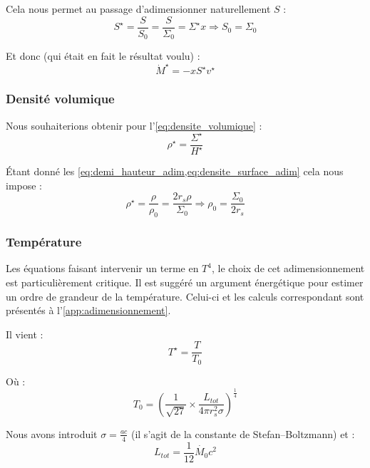 Cela nous permet au passage d’adimensionner naturellement $S$ :
\begin{equation}
    S^\star = \frac{S}{S_0} = \frac{S}{\Sigma_0} = \Sigma^\star x \Rightarrow S_0 = \Sigma_0
\end{equation}

Et donc (qui était en fait le résultat voulu) :
\begin{equation}
    \dot{M}^\star = - x S^\star v^\star
\end{equation}

\subsubsection{Densité volumique}

Nous souhaiterions obtenir pour l’\cref{eq:densite_volumique} :
\begin{equation}
    \rho^\star = \frac{\Sigma^\star}{H^\star}
\end{equation}

Étant donné les \cref{eq:demi_hauteur_adim,eq:densite_surface_adim} cela nous
impose :
\begin{equation}
    \rho^\star = \frac{\rho}{\rho_0} = \frac{2 r_s \rho}{\Sigma_0} \Rightarrow \rho_0 = \frac{\Sigma_0}{2 r_s}
\end{equation}

\subsubsection{Température}

Les équations faisant intervenir un terme en $T^4$, le choix de cet
adimensionnement est particulièrement critique. Il est suggéré un argument
énergétique pour estimer un ordre de grandeur de la température. Celui-ci et
les calculs correspondant sont présentés à l’\cref{app:adimensionnement}. 

Il vient :
\begin{equation}
    T^{\star} = \frac{T}{T_0}
\end{equation}

Où :
\begin{equation}
    T_0 = \left(\frac{1}{\sqrt{27}} \times \frac{L_{tot}}{4 \pi r_s^2 \sigma} \right)^\frac{1}{4}
\end{equation}

Nous avons introduit $\sigma = \frac{a c}{4}$ (il s’agit de la constante de
Stefan–Boltzmann) et :
\begin{equation}
    L_{tot} = \frac{1}{12} \dot{M_0} c^2
\end{equation}

